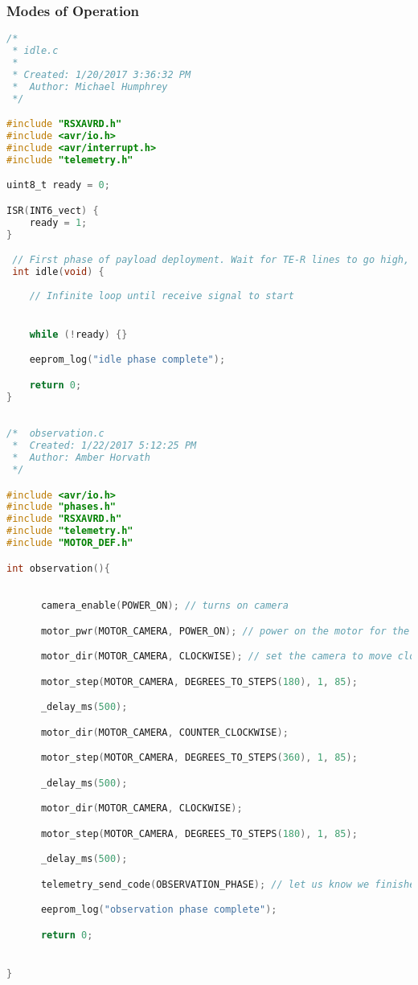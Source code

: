 \subsubsection{Modes of Operation}
\begin{lstlisting}[language=C]
/*
 * idle.c
 *
 * Created: 1/20/2017 3:36:32 PM
 *  Author: Michael Humphrey
 */

#include "RSXAVRD.h"
#include <avr/io.h>
#include <avr/interrupt.h>
#include "telemetry.h"

uint8_t ready = 0;

ISR(INT6_vect) {
	ready = 1;
}

 // First phase of payload deployment. Wait for TE-R lines to go high, then return.
 int idle(void) {
	
	// Infinite loop until receive signal to start


	while (!ready) {}

	eeprom_log("idle phase complete");

	return 0;
}
\end{lstlisting}

\begin{lstlisting}[language=C]

/*  observation.c
 *  Created: 1/22/2017 5:12:25 PM
 *  Author: Amber Horvath
 */

#include <avr/io.h>
#include "phases.h"
#include "RSXAVRD.h"
#include "telemetry.h"
#include "MOTOR_DEF.h"

int observation(){

     
      camera_enable(POWER_ON); // turns on camera

      motor_pwr(MOTOR_CAMERA, POWER_ON); // power on the motor for the camera

      motor_dir(MOTOR_CAMERA, CLOCKWISE); // set the camera to move clockwise

      motor_step(MOTOR_CAMERA, DEGREES_TO_STEPS(180), 1, 85);

      _delay_ms(500);

      motor_dir(MOTOR_CAMERA, COUNTER_CLOCKWISE);

      motor_step(MOTOR_CAMERA, DEGREES_TO_STEPS(360), 1, 85);

      _delay_ms(500);

      motor_dir(MOTOR_CAMERA, CLOCKWISE);

      motor_step(MOTOR_CAMERA, DEGREES_TO_STEPS(180), 1, 85);

      _delay_ms(500); 

      telemetry_send_code(OBSERVATION_PHASE); // let us know we finished Observation mode

      eeprom_log("observation phase complete");

      return 0;


}

\end{lstlisting}

